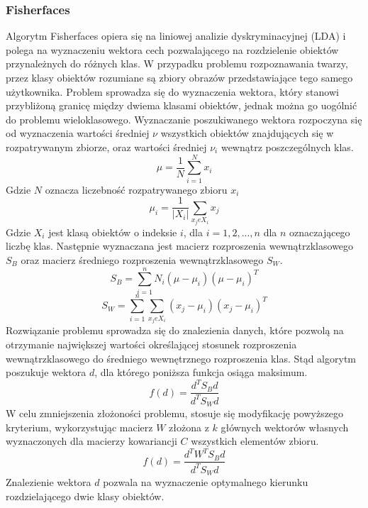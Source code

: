 \subsubsection{Fisherfaces} \label{fisher}
Algorytm Fisherfaces opiera się na liniowej analizie dyskryminacyjnej (LDA) i polega na wyznaczeniu wektora cech pozwalającego na rozdzielenie obiektów przynależnych do różnych klas. W przypadku problemu rozpoznawania twarzy, przez klasy obiektów rozumiane są zbiory obrazów przedstawiające tego samego użytkownika. Problem sprowadza się do wyznaczenia wektora, który stanowi przybliżoną granicę między dwiema klasami obiektów, jednak można go uogólnić do problemu wieloklasowego.
Wyznaczanie poszukiwanego wektora rozpoczyna się od wyznaczenia wartości średniej $\nu$ wszystkich obiektów znajdujących się w rozpatrywanym zbiorze, oraz wartości średniej $\nu_{i}$ wewnątrz poszczególnych klas. 
$$
\mu=\frac{1}{N}\sum_{i=1}^{N}x_{i}
$$
Gdzie $N$ oznacza liczebność rozpatrywanego zbioru $x_{i}$
$$
\mu_{i}=\frac{1}{|X_{i}|}\sum_{x_{j}eX_{i}}x_{j}
$$
Gdzie $X_{i}$ jest klasą obiektów o indeksie $i$, dla $i=1,2,...,n$ dla $n$ oznaczającego liczbę klas. Następnie wyznaczana jest macierz rozproszenia wewnątrzklasowego $S_{B}$ oraz macierz średniego rozproszenia wewnątrzklasowego $S_{W}$.
$$
S_{B}=\sum_{i=1}^{n}N_{i}(\mu-\mu_{i})(\mu-\mu_{i})^{T}
$$
$$
S_{W}=\sum_{i=1}^{n}\sum_{x_{j}eX_{i}}(x_{j}-\mu_{i})(x_{j}-\mu_{i})^{T}
$$
Rozwiązanie problemu sprowadza się do znalezienia danych, które pozwolą na otrzymanie największej wartości określającej stosunek rozproszenia wewnątrzklasowego do średniego wewnętrznego rozproszenia klas. Stąd algorytm poszukuje wektora $d$, dla którego poniższa funkcja osiąga maksimum.
$$
f(d)=\frac{d^{T}S_{B}d}{d^{T}S_{W}d}
$$
W celu zmniejszenia złożoności problemu, stosuje się modyfikację powyższego kryterium, wykorzystując macierz $W$ złożona z $k$ głównych wektorów własnych wyznaczonych dla macierzy kowariancji $C$ wszystkich elementów zbioru.
$$
f(d)=\frac{d^{T}W^{T}S_{B}d}{d^{T}S_{W}d}
$$
Znalezienie wektora $d$ pozwala na wyznaczenie optymalnego kierunku rozdzielającego dwie klasy obiektów.
